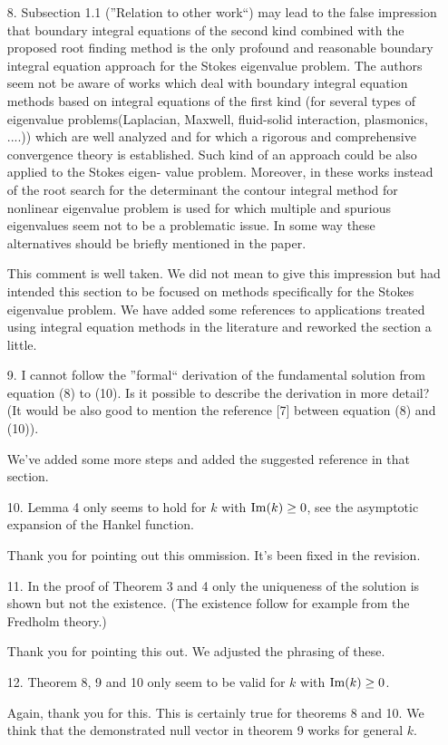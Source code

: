 \documentclass{article}
\begin{document}
\begin{itemize}
\item[8.] {\color{blue}Subsection 1.1 (”Relation to other work“) may
  lead to the false impression that boundary integral equations of the
  second kind combined with the proposed root finding method is the only
  profound and reasonable boundary integral equation approach for the Stokes
  eigenvalue problem. The authors seem not be aware of works which deal with
  boundary integral equation methods based on integral equations of the
  first kind (for several types of eigenvalue problems(Laplacian, Maxwell,
  fluid-solid interaction, plasmonics, ....)) which are well analyzed and for
  which a rigorous and comprehensive convergence theory is established.
  Such kind of an approach could be also applied to the Stokes eigen-
  value problem. Moreover, in these works instead of the root search for
  the determinant the contour integral method for nonlinear eigenvalue
  problem is used for which multiple and spurious eigenvalues seem not
  to be a problematic issue. In some way these alternatives should be
  briefly mentioned in the paper.}

  This comment is well taken.
  We did not mean to give this impression but had intended this section
  to be focused on methods specifically for the Stokes eigenvalue problem.
  We have added some references to applications treated using integral
  equation methods in the literature and reworked the section
  a little.

\item[9.] {\color{blue}
  I cannot follow the ”formal“ derivation of the fundamental solution from
  equation (8) to (10). Is it possible to describe the derivation in more
  detail? (It would be also good to mention the reference [7] between
  equation (8) and (10)).}

  We've added some more steps and added the suggested
  reference in that section.

\item[10.] {\color{blue}
  Lemma 4 only seems to hold for $k$ with ${\rm Im}(k) \geq 0$,
  see the asymptotic expansion of the Hankel function.}

  Thank you for pointing out this ommission. It's been fixed
  in the revision.

\item[11.] {\color{blue} In the proof of Theorem 3 and 4 only the
  uniqueness of the solution is shown but not the existence.
  (The existence follow for example from the Fredholm theory.)}

  Thank you for pointing this out. We adjusted the
  phrasing of these.

\item[12.] {\color{blue}
  Theorem 8, 9 and 10 only seem to be valid for $k$ with
  ${\rm Im}(k) \geq 0$.}

  Again, thank you for this. This is certainly true for theorems
  8 and 10. We think that the demonstrated null vector in
  theorem 9 works for general $k$.

\end{itemize}
\end{document}
